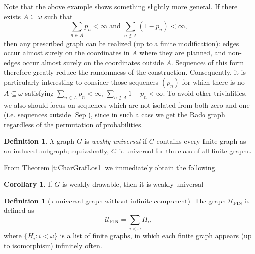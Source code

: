 \documentclass{amsart}
\theoremstyle{plain}
\theoremstyle{definition}
\newtheorem{df}[theorem]{Definition}
\newtheorem{cor}[theorem]{Corollary}
\theoremstyle{remark}
\numberwithin{equation}{section}
\newcommand{\on}{\operatorname}
\newcommand{\UU}{\mathcal{U}}
\DeclareMathOperator{\fin}{FIN}
\begin{document}
Note that the above example shows something slightly more general. If there exists \(A\subseteq\omega\) such that 
$$\sum\limits_{n\in A} p_n<\infty \text{ and }  \sum\limits_{n\notin A}(1-p_n)<\infty,$$
then any prescribed graph can be realized (up to a finite modification): edges occur almost surely on the coordinates in \(A\) where they are planned, and non-edges occur almost surely on the coordinates outside \(A\).  Sequences of this form therefore greatly reduce the randomness of the construction.  Consequently, it is particularly interesting to consider those sequences $(p_n)$ for which there is no $A\subseteq \omega$ satisfying $\sum\limits_{n\in A} p_n<\infty$, $\sum\limits_{n\notin A}1- p_n <\infty$. To avoid other trivialities, we also should focus on sequences which are not isolated from both zero and one (i.e. sequences outside $\on{Sep}$), since in such a case we get the Rado graph regardless of the permutation of probabilities.
\begin{df}
A graph \(G\) is \emph{weakly universal} if \(G\) contains every finite graph as an induced subgraph; equivalently, \(G\) is universal for the class of all finite graphs.
\end{df}
From Theorem \ref{t:CharGrafLos1} we immediately obtain the following.
\begin{cor}
    If $G$ is weakly drawable, then it is weakly universal.
\end{cor}


\begin{df}[a universal graph without infinite component]\label{P:GIG}
    The graph $\UU_{\fin}$ is defined as
    $$\UU_{\fin}=\sum\limits_{i<\omega}H_i,$$
    where $\{H_i : i<\omega\}$ is a list of finite graphs, in which each finite graph appears (up to isomorphism) infinitely often.
\end{df}
\end{document}
